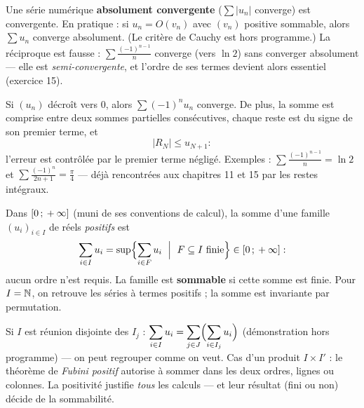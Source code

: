 
\begin{theoreme}
Une série numérique \textbf{absolument convergente}
($\sum|u_n|$ converge) est convergente. En pratique : si
$u_n=O(v_n)$ avec $(v_n)$ positive sommable, alors $\sum u_n$ converge
absolument. (Le critère de Cauchy est hors programme.) La réciproque est
fausse : $\sum\frac{(-1)^{n-1}}{n}$ converge (vers $\ln2$) sans converger
absolument — elle est \emph{semi-convergente}, et l'ordre de ses termes
devient alors essentiel (exercice 15).
\end{theoreme}


\begin{theoreme}
Si $(u_n)$ décroît vers $0$, alors $\sum(-1)^{n}u_n$ converge. De plus, la
somme est comprise entre deux sommes partielles consécutives, chaque reste
est du signe de son premier terme, et
\[
|R_N|\leqslant u_{N+1} :
\]
l'erreur est contrôlée par le premier terme négligé. Exemples :
$\sum\frac{(-1)^{n-1}}{n}=\ln2$ et $\sum\frac{(-1)^{n}}{2n+1}=\frac\pi4$
— déjà rencontrées aux chapitres 11 et 15 par les restes intégraux.
\end{theoreme}


\begin{definition}
Dans $\mathopen{[}0\,{;}\,+\infty\mathclose{]}$ (muni de ses conventions de calcul), la somme
d'une famille $(u_i)_{i\in I}$ de réels \emph{positifs} est
\[
\sum_{i\in I}u_i=\sup\Bigl\{\sum_{i\in F}u_i\ \Bigm|\ F\subseteq I
\text{ finie}\Bigr\}\in\mathopen{[}0\,{;}\,+\infty\mathclose{]} :
\]
aucun ordre n'est requis. La famille est \textbf{sommable} si cette somme
est finie. Pour $I=\mathbb{N}$, on retrouve les séries à termes positifs ; la
somme est invariante par permutation.
\end{definition}

\begin{theoreme}
Si $I$ est réunion disjointe des $I_j$ :
$\displaystyle\sum_{i\in I}u_i=\sum_{j\in J}\Bigl(\sum_{i\in I_j}u_i\Bigr)$
(démonstration hors programme) — on peut regrouper comme on veut. Cas
d'un produit $I\times I'$ : le théorème de \emph{Fubini positif} autorise
à sommer dans les deux ordres, lignes ou colonnes. La positivité justifie
\emph{tous} les calculs — et leur résultat (fini ou non) décide de la
sommabilité.
\end{theoreme}

